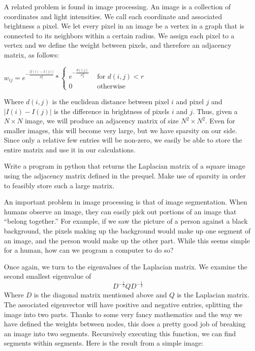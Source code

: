 \documentclass{newsiambook}
\begin{document}
A related problem is found in image processing.  An image is a collection of coordinates and light intensities.  We call each coordinate and associated brightness a pixel. We let every pixel in an image be a vertex in a graph that is connected to its neighbors within a certain radius.  We assign each pixel to a vertex and we define the weight between pixels, and therefore an adjacency matrix, as follows:

\begin{center}
$w_{ij} = e^{-\frac{|I(i) - I(j)|}{\sigma_I^2}} * \begin{cases} e^{-\frac{d(i,j)}{\sigma_d^2}} & \mbox{ for $d(i,j) < r$} \\ 0 & \mbox{ otherwise} \end{cases}$
\end{center}

Where $d(i,j)$ is the euclidean distance between pixel $i$ and pixel $j$ and $|I(i) - I(j)|$ is the difference in brightness of pixels $i$ and $j$.  Thus, given a $N\times N$ image, we will produce an adjacency matrix of size $N^2\times N^2$.  Even for smaller images, this will become very large, but we have sparsity on our side.  Since only a relative few entries will be non-zero, we easily be able to store the entire matrix and use it in our calculations.

\begin{problem}  Write a program in python that returns the Laplacian matrix of a square image using the adjacency matrix defined in the prequel.  Make use of sparsity in order to feasibly store such a large matrix.
\end{problem}

An important problem in image processing is that of image segmentation.  When humans observe an image, they can easily pick out portions of an image that ``belong together.''  For example, if we saw the picture of a person against a black background, the pixels making up the background would make up one segment of an image, and the person would make up the other part.  While this seems simple for a human, how can we program a computer to do so?

Once again, we turn to the eigenvalues of the Laplacian matrix.  We examine the second smallest eigenvalue of
\[
D^{-\frac{1}{2}}QD^{-\frac{1}{2}}
\]
Where $D$ is the diagonal matrix mentioned above and $Q$ is the Laplacian matrix.  The associated eigenvector will have positive and negative entries, splitting the image into two parts.  Thanks to some very fancy mathematics and the way we have defined the weights between nodes, this does a pretty good job of breaking an image into two segments.  Recursively executing this function, we can find segments within segments.  Here is the result from a simple image:
\end{document}
